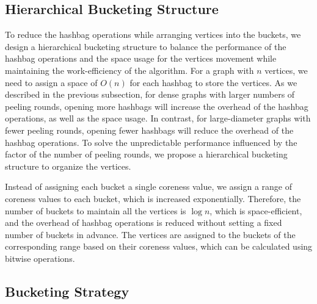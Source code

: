 {\subsection{Hierarchical Bucketing Structure}

To reduce the hashbag operations while arranging vertices into the buckets,
we design a hierarchical bucketing structure to balance the performance of the hashbag operations
and the space usage for the vertices movement while maintaining the work-efficiency of the algorithm.
For a graph with $n$ vertices,
we need to assign a space of $O(n)$ for each hashbag to store the vertices.
As we described in the previous subsection,
for dense graphs with larger numbers of peeling rounds,
opening more hashbags will increase the overhead of the hashbag operations,
as well as the space usage.
In contrast, for large-diameter graphs with fewer peeling rounds,
opening fewer hashbags will reduce the overhead of the hashbag operations.
To solve the unpredictable performance influenced by the factor of the number of peeling rounds,
we propose a hierarchical bucketing structure to organize the vertices.

Instead of assigning each bucket a single coreness value,
we assign a range of coreness values to each bucket,
which is increased exponentially.
Therefore, the number of buckets to maintain all the vertices is $\log n$,
which is space-efficient,
and the overhead of hashbag operations is reduced without setting a fixed number of buckets in advance.
The vertices are assigned to the buckets of the corresponding range based on their coreness values,
which can be calculated using bitwise operations.



\subsection{Bucketing Strategy}

}



